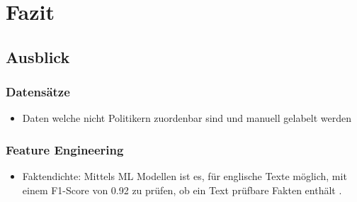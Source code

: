 
\chapter{Fazit} \label{ch:conclusion}

\section{Ausblick}

\subsection{Datensätze}

\begin{itemize}
    \item Daten welche nicht Politikern zuordenbar sind und manuell gelabelt werden
\end{itemize}

\subsection{Feature Engineering}

\begin{itemize}
    \item Faktendichte: Mittels \ac{ML} Modellen ist es, für englische Texte möglich, mit einem F1-Score von \num{0.92} zu prüfen, ob ein Text prüfbare Fakten enthält \autocite{jha_towards_2023}.
\end{itemize}
